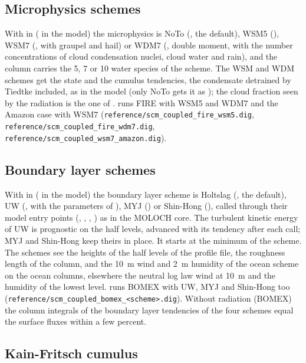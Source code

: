 \subsection{Microphysics schemes}

With  in  ( in the
model) the microphysics is NoTo (, the default), WSM5
(), WSM7 (, with graupel and hail) or WDM7
(, double moment, with the number
concentrations of cloud condensation nuclei, cloud water and rain), and
the column carries the 5, 7 or 10 water species of the scheme. The WSM
and WDM schemes get the state and the cumulus tendencies, the condensate
detrained by Tiedtke included, as in the model (only NoTo gets it as
); the cloud fraction seen by the radiation is the one of
.  runs FIRE with WSM5 and WDM7 and the
Amazon case with WSM7 (\verb=reference/scm_coupled_fire_wsm5.dig=,
\verb=reference/scm_coupled_fire_wdm7.dig=,
\verb=reference/scm_coupled_wsm7_amazon.dig=).

\subsection{Boundary layer schemes}

With  in  ( in the
model) the boundary layer scheme is Holtslag (, the
default), UW (, with the parameters of ), MYJ
() or Shin-Hong (), called
through their model entry points (, ,
, ) as in the MOLOCH core. The
turbulent kinetic energy of UW is prognostic on the half levels, advanced
with its tendency after each call; MYJ and Shin-Hong keep theirs in place.
It starts at the minimum of the scheme. The schemes see the heights of
the half levels of the profile file, the roughness length of the column,
and the 10~m wind and 2~m humidity of the ocean scheme on the ocean
columns, elsewhere the neutral log law wind at 10~m and the humidity of
the lowest level.  runs BOMEX with UW, MYJ and
Shin-Hong too (\verb=reference/scm_coupled_bomex_<scheme>.dig=). Without
radiation (BOMEX) the column integrals of the boundary layer tendencies
of the four schemes equal the surface fluxes within a few percent.

\subsection{Kain-Fritsch cumulus}

